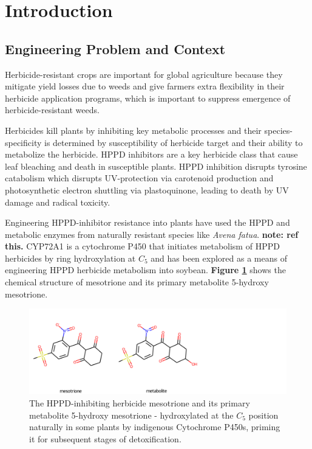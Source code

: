 \documentclass[16pt]{book}
\begin{document}
\section{Introduction}

\subsection{Engineering Problem and Context}

Herbicide-resistant crops are important for global agriculture because they mitigate yield losses due to weeds and give farmers extra flexibility in their herbicide application programs, which is important to suppress emergence of herbicide-resistant weeds. %
\par
Herbicides kill plants by inhibiting key metabolic processes and their species-specificity is determined by susceptibility of herbicide target and their ability to  metabolize the herbicide. %
HPPD inhibitors are a key herbicide class that cause leaf bleaching and death in susceptible plants. 
HPPD inhibition  disrupts tyrosine catabolism which disrupts UV-protection via carotenoid production and photosynthetic electron shuttling via plastoquinone, leading to death by UV damage and radical toxicity. %
\par
Engineering HPPD-inhibitor resistance into plants have used the HPPD and metabolic enzymes from naturally resistant species like \textit{Avena fatua}. 
\textbf{note: ref this.}
CYP72A1 is a cytochrome P450 that initiates metabolism of HPPD herbicides by ring hydroxylation at $C_5$ and has been explored as a means of engineering HPPD herbicide metabolism into soybean.
\textbf{Figure \ref{mesotrione}} shows the chemical structure of mesotrione and its primary metabolite 5-hydroxy mesotrione. %

\begin{figure}
	\begin{center}
	\caption{\label{mesotrione} The HPPD-inhibiting herbicide mesotrione and its primary metabolite 5-hydroxy mesotrione - hydroxylated at the $C_5$ position naturally in some plants by indigenous Cytochrome P450s, priming it for subsequent stages of detoxification.}
	\includegraphics[width = \textwidth]{img/mesotrione+metabolite.png}
	\end{center}
\end{figure}
\end{document}
